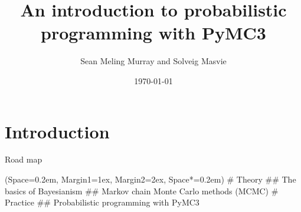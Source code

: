 \documentclass[12pt, aspectratio=149]{beamer}
\title{An introduction to probabilistic programming with PyMC3}
\date{\today}
\author{Sean Meling Murray and Solveig Masvie}
\newcommand{\listSpace}{0.2em}
\theoremstyle{plain}
\begin{document}
\maketitle
{}

\section{Introduction}
\begin{frame}[fragile]{Road map}
	\begin{easylist}[enumerate]
		\ListProperties(Space=\listSpace, Margin1=1ex, Margin2=2ex, Space*=\listSpace)
		# Theory
		## The basics of Bayesianism
		## Markov chain Monte Carlo methods (MCMC)
		# Practice
		## Probabilistic programming with PyMC3
	\end{easylist}
\end{frame}
\end{document}
